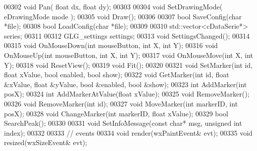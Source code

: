 \begin{DoxyCode}
00302     \textcolor{keywordtype}{void} Pan( \textcolor{keywordtype}{float} dx, \textcolor{keywordtype}{float} dy);
00303 
00304     \textcolor{keywordtype}{void} SetDrawingMode( eDrawingMode mode );
00305     \textcolor{keywordtype}{void} Draw();
00306 
00307     \textcolor{keywordtype}{bool} SaveConfig(\textcolor{keywordtype}{char} *file);
00308     \textcolor{keywordtype}{bool} LoadConfig(\textcolor{keywordtype}{char} *file);
00309 
00310     std::vector<cDataSerie*> series;
00311 
00312     GLG_settings settings;
00313     \textcolor{keywordtype}{void} SettingsChanged();
00314 
00315     \textcolor{keywordtype}{void} OnMouseDown(\textcolor{keywordtype}{int} mouseButton, \textcolor{keywordtype}{int} X, \textcolor{keywordtype}{int} Y);
00316     \textcolor{keywordtype}{void} OnMouseUp(\textcolor{keywordtype}{int} mouseButton, \textcolor{keywordtype}{int} X, \textcolor{keywordtype}{int} Y);
00317     \textcolor{keywordtype}{void} OnMouseMove(\textcolor{keywordtype}{int} X, \textcolor{keywordtype}{int} Y);
00318     \textcolor{keywordtype}{void} ResetView();
00319     \textcolor{keywordtype}{void} Fit();
00320 
00321     \textcolor{keywordtype}{void} SetMarker(\textcolor{keywordtype}{int} \textcolor{keywordtype}{id}, \textcolor{keywordtype}{float} xValue, \textcolor{keywordtype}{bool} enabled, \textcolor{keywordtype}{bool} show);
00322     \textcolor{keywordtype}{void} GetMarker(\textcolor{keywordtype}{int} \textcolor{keywordtype}{id}, \textcolor{keywordtype}{float} &xValue, \textcolor{keywordtype}{float} &yValue, \textcolor{keywordtype}{bool} &enabled, \textcolor{keywordtype}{bool} &show);
00323     \textcolor{keywordtype}{int} AddMarker(\textcolor{keywordtype}{int} posX);
00324     \textcolor{keywordtype}{int} AddMarkerAtValue(\textcolor{keywordtype}{float} xValue);
00325     \textcolor{keywordtype}{void} RemoveMarker();
00326     \textcolor{keywordtype}{void} RemoveMarker(\textcolor{keywordtype}{int} \textcolor{keywordtype}{id});
00327     \textcolor{keywordtype}{void} MoveMarker(\textcolor{keywordtype}{int} markerID, \textcolor{keywordtype}{int} posX);
00328     \textcolor{keywordtype}{void} ChangeMarker(\textcolor{keywordtype}{int} markerID, \textcolor{keywordtype}{float} xValue);
00329     \textcolor{keywordtype}{bool} SearchPeak();
00330 
00331     \textcolor{keywordtype}{void} SetInfoMessage(\textcolor{keyword}{const} \textcolor{keywordtype}{char}* msg, \textcolor{keywordtype}{unsigned} \textcolor{keywordtype}{int} index);
00332 
00333     \textcolor{comment}{// events}
00334     \textcolor{keywordtype}{void} render(wxPaintEvent& evt);
00335     \textcolor{keywordtype}{void} resized(wxSizeEvent& evt);

\end{DoxyCode}
